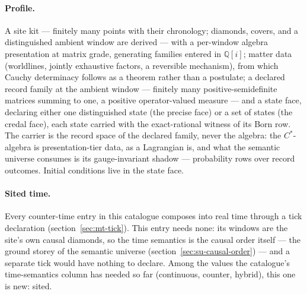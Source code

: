 \paragraph{Profile.} A site kit --- finitely many points with their
chronology; diamonds, covers, and a distinguished ambient window are
derived --- with a per-window algebra presentation at matrix grade,
generating families entered in $\mathbb{Q}[i]$; matter data
(worldlines, jointly exhaustive factors, a reversible mechanism),
from which Cauchy determinacy follows as a theorem rather than a
postulate; a declared record family at the ambient window ---
finitely many positive-semidefinite matrices summing to one, a
positive operator-valued measure --- and a state face, declaring
either one distinguished state (the precise face) or a set of states
(the credal face), each state carried with the exact-rational
witness of its Born row. The carrier is the record space of the
declared family, never the algebra: the $C^*$-algebra is
presentation-tier data, as a Lagrangian is, and what the semantic
universe consumes is its gauge-invariant shadow --- probability rows
over record outcomes. Initial conditions live in the state face.

\paragraph{Sited time.} Every counter-time entry in this catalogue
composes into real time through a tick declaration
(section~\ref{sec:mt-tick}). This entry needs none: its windows are
the site's own causal diamonds, so the time semantics is the causal
order itself --- the ground storey of the semantic universe
(section~\ref{sec:su-causal-order}) --- and a separate tick would
have nothing to declare. Among the values the catalogue's
time-semantics column has needed so far (continuous, counter,
hybrid), this one is new: sited.

